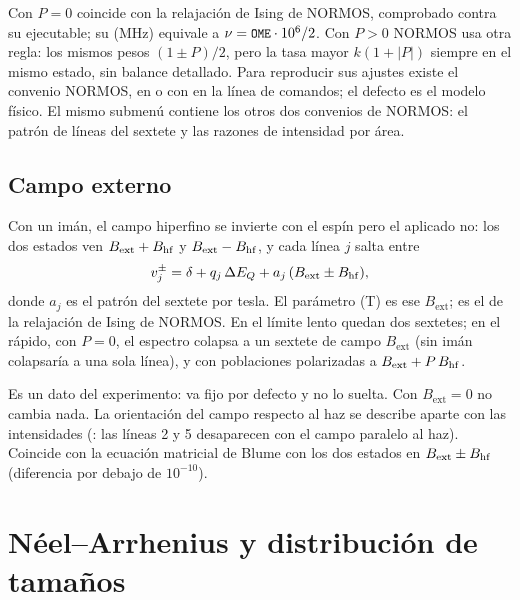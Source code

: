 Con $P = 0$ coincide con la relajación de Ising de NORMOS, comprobado contra su
ejecutable; su  (MHz) equivale a $\nu = \texttt{\small OME}\cdot10^{6}/2$.
Con $P > 0$ NORMOS usa otra regla: los mismos pesos $(1\pm P)/2$, pero la tasa
mayor $k(1+|P|)$ siempre en el mismo estado, sin balance detallado. Para
reproducir sus ajustes existe el convenio NORMOS, en  o con
 en la línea de comandos; el defecto es el
modelo físico. El mismo submenú contiene los otros dos convenios de NORMOS: el
patrón de líneas del sextete y las razones de intensidad por área.

\subsection{Campo externo}
\label{sec:relax-bext}

Con un imán, el campo hiperfino se invierte con el espín pero el aplicado no: los
dos estados ven $B_\mathrm{ext}+B_{\mathrm{hf}}$ y $B_\mathrm{ext}-B_{\mathrm{hf}}$, y cada línea $j$
salta entre
\begin{equation}
  v_j^\pm = \delta + q_j\,\Delta E_{Q} + a_j\,(B_\mathrm{ext} \pm B_{\mathrm{hf}}),
\end{equation}
donde $a_j$ es el patrón del sextete por tesla. El parámetro  (T) es ese $B_\mathrm{ext}$; es el  de la relajación de Ising de
NORMOS. En el límite lento quedan dos sextetes; en el rápido, con $P=0$, el
espectro colapsa a un sextete de campo $B_\mathrm{ext}$ (sin imán colapsaría a una
sola línea), y con poblaciones polarizadas a $B_\mathrm{ext}+P\,B_{\mathrm{hf}}$.

Es un dato del experimento: va fijo por defecto y  no lo
suelta. Con $B_\mathrm{ext}=0$ no cambia nada. La orientación del campo respecto al
haz se describe aparte con las intensidades (: las líneas 2 y 5
desaparecen con el campo paralelo al haz). Coincide con la ecuación matricial de
Blume con los dos estados en $B_\mathrm{ext}\pm B_{\mathrm{hf}}$ (diferencia por debajo de
$10^{-10}$).

\section{Néel--Arrhenius y distribución de tamaños}

